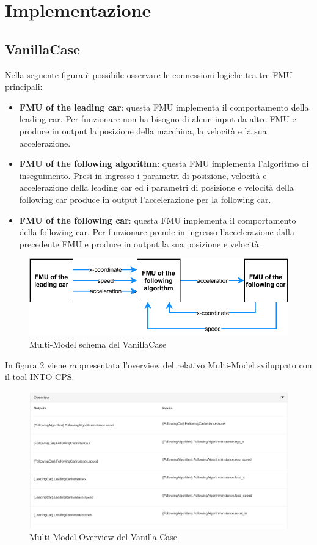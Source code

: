 \section{Implementazione}
\subsection{VanillaCase}
Nella seguente figura è possibile osservare le connessioni logiche tra tre FMU principali: 
\begin{itemize}
	\item \textbf{FMU of the leading car}: questa FMU implementa il comportamento della leading car. Per funzionare non ha bisogno di alcun input da altre FMU e produce in output la posizione della macchina, la velocità e la sua accelerazione. 
	\item \textbf{FMU of the following algorithm}: questa FMU implementa l'algoritmo di inseguimento. Presi in ingresso i parametri di posizione, velocità e accelerazione della leading car ed i parametri di posizione e velocità della following car produce in output l'accelerazione per la following car.
	\item \textbf{FMU of the following car}: questa FMU implementa il comportamento della following car. Per funzionare prende in ingresso l'accelerazione dalla precedente FMU e produce in output la sua posizione e velocità.
\end{itemize}
\begin{figure}[H]
	\centering
	\includegraphics{img/VanillaSchema.pdf}
	\caption{Multi-Model schema del VanillaCase}
\end{figure}

In figura 2 viene rappresentata l'overview del relativo Multi-Model sviluppato con il tool INTO-CPS. 

\begin{figure}[H]
	\centering
	\includegraphics[width=\textwidth]{img/OverviewVanilla.png}
	\caption{Multi-Model Overview del Vanilla Case}
\end{figure}

